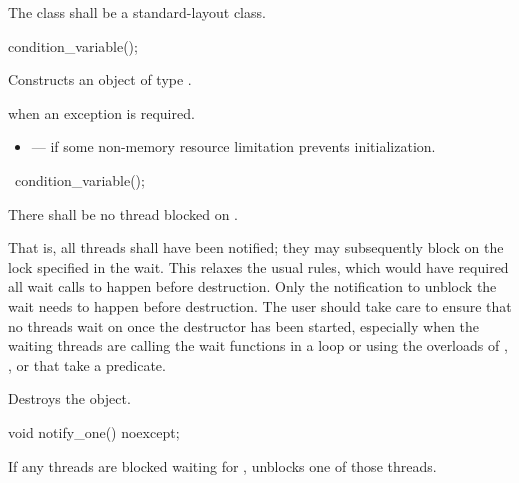 \pnum
The class  shall be a standard-layout class.

%
\begin{itemdecl}
condition_variable();
\end{itemdecl}

\begin{itemdescr}
\pnum
\effects Constructs an object of type .

\pnum
\throws {} when an exception is required.

\pnum
\errors
\begin{itemize}
\item {} --- if some non-memory resource
limitation prevents initialization.
\end{itemize}
\end{itemdescr}

%
\begin{itemdecl}
~condition_variable();
\end{itemdecl}

\begin{itemdescr}
\pnum
\requires There shall be no thread blocked on . \begin{note} That is, all
threads shall have been notified; they may subsequently block on the lock specified in the
wait.
This relaxes the usual rules, which would have required all wait calls to happen before
destruction. Only the notification to unblock the wait needs to happen before destruction.
The user should take care to ensure that no threads wait on  once the destructor has
been started, especially when the waiting threads are calling the wait functions in a loop or
using the overloads of , , or  that take a predicate.
\end{note}

\pnum\effects Destroys the object.
\end{itemdescr}

%
\begin{itemdecl}
void notify_one() noexcept;
\end{itemdecl}

\begin{itemdescr}
\pnum\effects If any threads are blocked waiting for , unblocks one of those threads.
\end{itemdescr}

